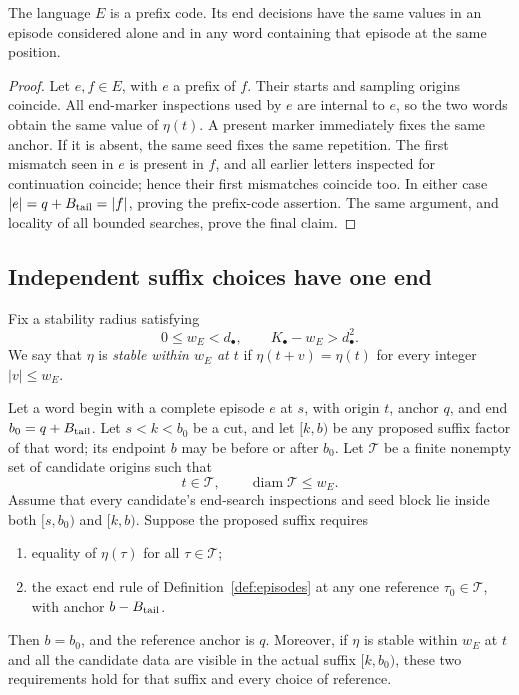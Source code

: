 \begin{lemma}\label{lem:prefix-code}
The language $E$ is a prefix code.  Its end decisions have the same
values in an episode considered alone and in any word containing that
episode at the same position.
\end{lemma}

\begin{proof}
Let $e,f\in E$, with $e$ a prefix of $f$.  Their starts and sampling
origins coincide.  All end-marker inspections used by $e$ are internal
to $e$, so the two words obtain the same value of $\eta(t)$.  A present
marker immediately fixes the same anchor.  If it is absent, the same
seed fixes the same repetition.  The first mismatch seen in $e$ is
present in $f$, and all earlier letters inspected for continuation
coincide; hence their first mismatches coincide too.  In either case
$|e|=q+B_{\rm tail}=|f|$, proving the prefix-code assertion.  The same
argument, and locality of all bounded searches, prove the final claim.
\end{proof}

\subsection{Independent suffix choices have one end}

Fix a stability radius satisfying
\begin{equation}\label{eq:end-overlap}
 0\le w_E<d_\bullet,
 \qquad K_\bullet-w_E>d_\bullet^2.
\end{equation}
We say that $\eta$ is \emph{stable within $w_E$ at $t$} if
$\eta(t+v)=\eta(t)$ for every integer $|v|\le w_E$.

\begin{lemma}
\label{lem:shared-anchor}
Let a word begin with a complete episode $e$ at $s$, with origin $t$,
anchor $q$, and end $b_0=q+B_{\rm tail}$.  Let $s<k<b_0$ be a cut, and
let $[k,b)$ be any proposed suffix factor of that word; its endpoint $b$
may be before or after $b_0$.  Let $\mathcal T$ be a finite nonempty set
of candidate origins such that
\[
 t\in\mathcal T,\qquad \operatorname{diam}\mathcal T\le w_E.
\]
Assume that every candidate's end-search inspections and seed block lie
inside both $[s,b_0)$ and $[k,b)$.  Suppose the proposed suffix requires
\begin{enumerate}[label=\textnormal{(\roman*)}]
\item equality of $\eta(\tau)$ for all $\tau\in\mathcal T$;
\item the exact end rule of Definition~\ref{def:episodes} at any one
reference $\tau_0\in\mathcal T$, with anchor $b-B_{\rm tail}$.
\end{enumerate}
Then $b=b_0$, and the reference anchor is $q$.
Moreover, if $\eta$ is stable within $w_E$ at $t$ and all the candidate
data are visible in the actual suffix $[k,b_0)$, these two requirements
hold for that suffix and every choice of reference.
\end{lemma}

